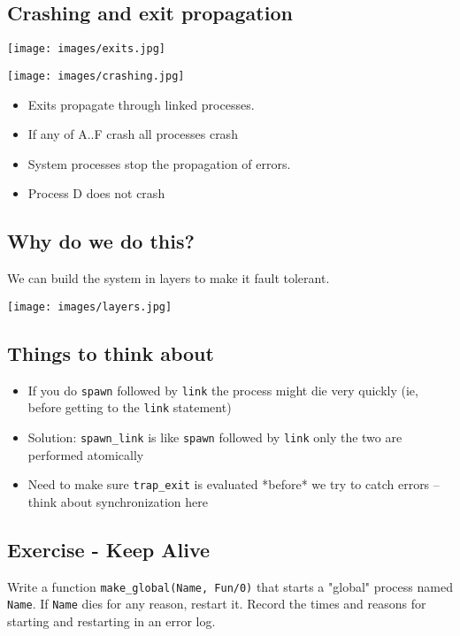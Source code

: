 \documentclass[12pt]{article}
\begin{document}
\subsection{Crashing and exit propagation}

\texttt{[image: images/exits.jpg]}

\texttt{[image: images/crashing.jpg]}

\begin{itemize}
\item Exits propagate through linked processes. 
\item If any of A..F crash all processes crash
\item System processes stop the propagation of errors. 
\item Process D  does not crash
\end{itemize}

\subsection{Why do we do this?}

We can build the system in layers to make it fault tolerant.

\texttt{[image: images/layers.jpg]}



\subsection{Things to think about}

\begin{itemize}
\item If you do \verb+spawn+ followed by \verb+link+ the process might
  die very quickly (ie, before getting to the \verb+link+ statement)
\item Solution: \verb+spawn_link+ is like \verb+spawn+ followed by \verb+link+ only the two are performed atomically
\item Need to make sure \verb+trap_exit+ is evaluated *before* we try
  to catch errors -- think about synchronization here
\end{itemize}


\subsection{Exercise - Keep Alive}

Write a function \verb+make_global(Name, Fun/0)+ that starts a
"global" process named \verb+Name+.  If \verb+Name+ dies for any
reason, restart it. Record the times and reasons for starting and
restarting in an error log.
\end{document}
